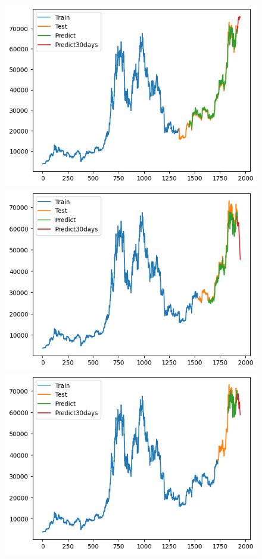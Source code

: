 \documentclass[conference]{IEEEtran}
\begin{document}
		\begin{figure}[H]
		\centering
		\begin{minipage}{0.15\textwidth}
			\centering
			\includegraphics[width=1\textwidth]{Figure/TimesNet_BTC_73.png}
		\end{minipage}
		\hfill
		\begin{minipage}{0.15\textwidth}
			\centering
			\includegraphics[width=1\textwidth]{Figure/TimesNet_BTC_82.png}
		\end{minipage}
		\hfill
		\begin{minipage}{0.15\textwidth}
			\centering
			\includegraphics[width=1\textwidth]{Figure/TimesNet_BTC_91.png}

\end{minipage}
\end{figure}
\end{document}
